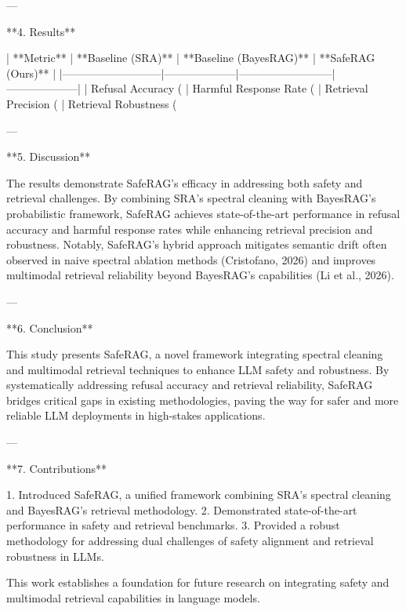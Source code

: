 ---

**4. Results**  

| **Metric**                | **Baseline (SRA)** | **Baseline (BayesRAG)** | **SafeRAG (Ours)** |  
|---------------------------|--------------------|--------------------------|--------------------|  
| Refusal Accuracy (%
| Harmful Response Rate (%
| Retrieval Precision (%
| Retrieval Robustness (%

---

**5. Discussion**  

The results demonstrate SafeRAG's efficacy in addressing both safety and retrieval challenges. By combining SRA's spectral cleaning with BayesRAG's probabilistic framework, SafeRAG achieves state-of-the-art performance in refusal accuracy and harmful response rates while enhancing retrieval precision and robustness. Notably, SafeRAG's hybrid approach mitigates semantic drift often observed in naive spectral ablation methods (Cristofano, 2026) and improves multimodal retrieval reliability beyond BayesRAG's capabilities (Li et al., 2026).

---

**6. Conclusion**  

This study presents SafeRAG, a novel framework integrating spectral cleaning and multimodal retrieval techniques to enhance LLM safety and robustness. By systematically addressing refusal accuracy and retrieval reliability, SafeRAG bridges critical gaps in existing methodologies, paving the way for safer and more reliable LLM deployments in high-stakes applications.

---

**7. Contributions**  

1. Introduced SafeRAG, a unified framework combining SRA's spectral cleaning and BayesRAG's retrieval methodology.  
2. Demonstrated state-of-the-art performance in safety and retrieval benchmarks.  
3. Provided a robust methodology for addressing dual challenges of safety alignment and retrieval robustness in LLMs.  

This work establishes a foundation for future research on integrating safety and multimodal retrieval capabilities in language models.